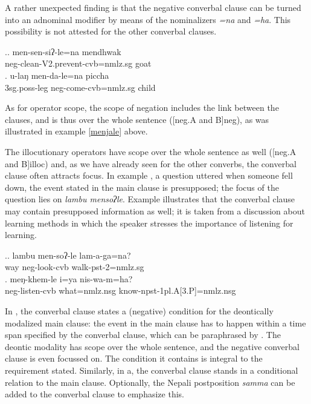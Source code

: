 	
A rather unexpected finding is that the negative converbal clause can be turned into an adnominal modifier by means of the nominalizers \emph{=na} and \emph{=ha}. This possibility is not attested for the other converbal clauses.

\ex.\ag. men-sen-siʔ-le=na    mendhwak\\
{\sc neg-}clean{\sc -V2.prevent-cvb=nmlz.sg} goat\\
 
 \bg. u-laŋ men-da-le=na piccha\\ 
	{\sc 3sg.poss}-leg {\sc neg-}come-{\sc cvb=nmlz.sg} child\\ 
	
As for operator scope, the scope of negation includes the link between the clauses, and is thus over the whole sentence  ([neg.A and B]{\sc neg}), as was illustrated in example \ref{menjale} above. 


The illocutionary operators have scope over the whole sentence as well ([neg.A and B]{\sc illoc}) and, as we have already seen for the other converbs, the converbal clause often attracts focus. In example \Next[a], a question uttered when someone fell down, the event stated in the main clause is presupposed; the focus of the question lies on \emph{lambu mensoʔle}. Example \Next[b] illustrates that the converbal clause may contain presupposed information as well; it is taken from a discussion about learning methods in which the speaker stresses the importance of listening for learning.

	\ex.\ag. lambu men-soʔ-le lam-a-ga=na?\\
		way   {\sc neg-}look{\sc -cvb} walk{\sc -pst-2=nmlz.sg}\\
	\bg.	meŋ-khem-le i=ya nis-wa-m=ha?\\
			{\sc neg}-listen-{\sc cvb} what{\sc =nmlz.nsg} know{\sc -npst-1pl.A[3.P]=nmlz.nsg}\\
	

In \Next[a], the converbal clause states a (negative) condition for the deontically modalized main clause: the event in the main clause has to happen within a time span specified by the converbal clause, which can be paraphrased by . The deontic modality has scope over the whole sentence, and the negative converbal clause is even focussed on. The condition it contains is integral to the requirement stated. Similarly, in \Next[b] a, the  converbal clause stands in a conditional relation to the main clause. Optionally, the Nepali postposition \emph{samma}  can be added to the converbal clause to emphasize this. 

